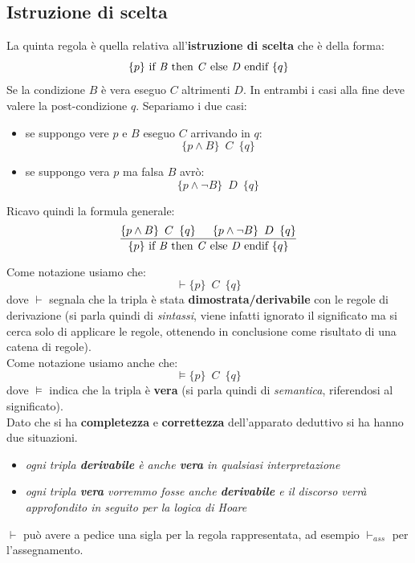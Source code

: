 \subsection{Istruzione di scelta}
\begin{definizione}
	La quinta regola è quella relativa all'\textbf{istruzione di scelta} che è
	della forma:
	\[\{p\}\mbox{ if \textit{B} then \textit{C} else \textit{D} endif }\{q\}\]
	Se la condizione $B$ è vera eseguo $C$ altrimenti $D$. In entrambi i casi
	alla fine deve valere la post-condizione $q$. Separiamo i due casi:
	\begin{itemize}
		\item se suppongo vere $p$ e $B$ eseguo $C$ arrivando in $q$:
		      \[\{p\land B\}\,\,\, C\,\,\,\{q\}\]
		\item se suppongo vera $p$ ma falsa $B$ avrò:
		      \[\{p\land \neg B\}\,\,\, D\,\,\,\{q\}\]
	\end{itemize}
	Ricavo quindi la formula generale:
	\begin{align}\label{ChooseRule}
		\frac{\{p\land B\}\,\,\, C\,\,\,\{q\}\,\,\,\,\,\,\,\,\,         
		\{p\land \neg B\}\,\,\, D\,\,\,\{q\}}{\{p\}\mbox{ if \textit{B} 
		then \textit{C} else \textit{D} endif }\{q\}}                  
	\end{align}
\end{definizione}
\begin{shaded}
	Come notazione usiamo che:
	\[\vdash \{p\}\,\,\, C\,\,\,\{q\}\]
	dove $\vdash$
	segnala che la tripla è stata \textbf{dimostrata/derivabile} con le regole di
	derivazione (si parla quindi di \textit{sintassi}, viene infatti ignorato il
	significato ma si cerca solo di applicare le regole, ottenendo in conclusione
	come risultato di una catena di regole).\\
	Come notazione usiamo anche che:
	\[\vDash \{p\}\,\,\, C\,\,\,\{q\}\]
	dove $\vDash$
	indica che la tripla è \textbf{vera} (si parla quindi di \textit{semantica},
	riferendosi al significato).\\
	Dato che si ha \textbf{completezza} e \textbf{correttezza} dell'apparato
	deduttivo si ha hanno due situazioni.
	\begin{itemize}
		\item \textit{ogni tripla \textbf{derivabile} è anche \textbf{vera} in
		qualsiasi interpretazione}
		\item \textit{ogni tripla \textbf{vera} vorremmo fosse anche
		      \textbf{derivabile} e il discorso verrà approfondito in seguito per la
		logica di Hoare}
	\end{itemize}
	$\vdash$ può avere a pedice una sigla per la regola rappresentata, ad esempio
	$\vdash_{ass}$ per l'assegnamento.
\end{shaded}
